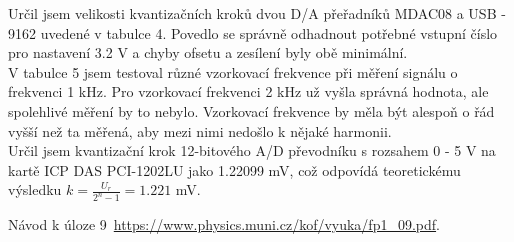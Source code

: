 \documentclass[a4paper,11pt]{article}
\begin{document}
Určil jsem velikosti kvantizačních kroků dvou D/A přeřadníků MDAC08 a USB - 9162 uvedené v tabulce 4. Povedlo se správně odhadnout potřebné vstupní číslo pro nastavení 3.2 V a chyby ofsetu a zesílení byly obě minimální. \\

V tabulce 5 jsem testoval různé vzorkovací frekvence při měření signálu o frekvenci 1 kHz. Pro vzorkovací frekvenci 2 kHz už vyšla správná hodnota, ale spolehlivé měření by to nebylo. Vzorkovací frekvence by měla být alespoň o řád vyšší než ta měřená, aby mezi nimi nedošlo k nějaké harmonii. \\

Určil jsem kvantizační krok 12-bitového A/D převodníku s rozsahem 0 - 5 V na kartě ICP DAS PCI-1202LU jako 1.22099 mV, což odpovídá teoretickému výsledku $k = \frac{U_r}{2^{n} -1}=1.221$ mV. \\


\begin{thebibliography}{0}
 Návod k úloze 9~\url{https://www.physics.muni.cz/kof/vyuka/fp1_09.pdf}.   
\end{thebibliography}
\end{document}
